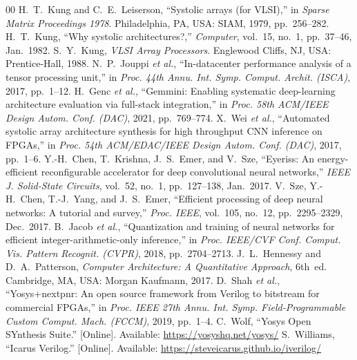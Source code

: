 \documentclass[conference]{IEEEtran}
\begin{document}
\begin{thebibliography}{00}
 H.~T.~Kung and C.~E.~Leiserson, ``Systolic arrays (for
VLSI),'' in \emph{Sparse Matrix Proceedings 1978}. Philadelphia, PA, USA: SIAM,
1979, pp.~256--282.
 H.~T.~Kung, ``Why systolic architectures?,''
\emph{Computer}, vol.~15, no.~1, pp.~37--46, Jan.~1982.
 S.~Y.~Kung, \emph{VLSI Array Processors}. Englewood Cliffs,
NJ, USA: Prentice-Hall, 1988.
 N.~P.~Jouppi \emph{et al.}, ``In-datacenter performance analysis
of a tensor processing unit,'' in \emph{Proc. 44th Annu. Int. Symp. Comput.
Archit. (ISCA)}, 2017, pp.~1--12.
 H.~Genc \emph{et al.}, ``Gemmini: Enabling systematic
deep-learning architecture evaluation via full-stack integration,'' in
\emph{Proc. 58th ACM/IEEE Design Autom. Conf. (DAC)}, 2021, pp.~769--774.
 X.~Wei \emph{et al.}, ``Automated systolic array architecture
synthesis for high throughput CNN inference on FPGAs,'' in \emph{Proc. 54th
ACM/EDAC/IEEE Design Autom. Conf. (DAC)}, 2017, pp.~1--6.
 Y.-H.~Chen, T.~Krishna, J.~S.~Emer, and V.~Sze, ``Eyeriss: An
energy-efficient reconfigurable accelerator for deep convolutional neural
networks,'' \emph{IEEE J. Solid-State Circuits}, vol.~52, no.~1, pp.~127--138,
Jan.~2017.
 V.~Sze, Y.-H.~Chen, T.-J.~Yang, and J.~S.~Emer, ``Efficient
processing of deep neural networks: A tutorial and survey,'' \emph{Proc. IEEE},
vol.~105, no.~12, pp.~2295--2329, Dec.~2017.
 B.~Jacob \emph{et al.}, ``Quantization and training of neural
networks for efficient integer-arithmetic-only inference,'' in \emph{Proc.
IEEE/CVF Conf. Comput. Vis. Pattern Recognit. (CVPR)}, 2018, pp.~2704--2713.
 J.~L.~Hennessy and D.~A.~Patterson, \emph{Computer
Architecture: A Quantitative Approach}, 6th~ed. Cambridge, MA, USA: Morgan
Kaufmann, 2017.
 D.~Shah \emph{et al.}, ``Yosys+nextpnr: An open source
framework from Verilog to bitstream for commercial FPGAs,'' in \emph{Proc. IEEE
27th Annu. Int. Symp. Field-Programmable Custom Comput. Mach. (FCCM)}, 2019,
pp.~1--4.
 C.~Wolf, ``Yosys Open SYnthesis Suite.'' [Online]. Available:
\url{https://yosyshq.net/yosys/}
 S.~Williams, ``Icarus Verilog.'' [Online]. Available:
\url{https://steveicarus.github.io/iverilog/}
\end{thebibliography}
\end{document}
